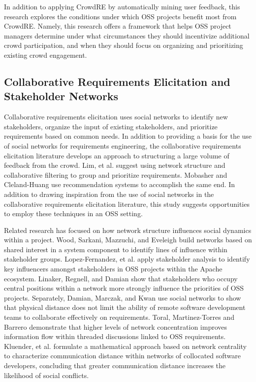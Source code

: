 In addition to applying CrowdRE by automatically mining user feedback, this research explores the conditions under which OSS projects benefit most from CrowdRE. Namely, this research offers a framework that helps OSS project managers determine under what circumstances they should incentivize additional crowd participation, and when they should focus on organizing and prioritizing existing crowd engagement. 

\subsection{Collaborative Requirements Elicitation and Stakeholder Networks}
\label{network_re}

Collaborative requirements elicitation \cite{stakerare, stakenet, stakesource, mobasher} uses social networks to identify new stakeholders, organize the input of existing stakeholders, and prioritize requirements based on common needs. In addition to providing a basis for the use of social networks for requirements engineering, the collaborative requirements elicitation literature develops an approach to structuring a large volume of feedback from the crowd. Lim, et al. \cite{stakerare, stakenet, stakesource, lim} suggest using network structure and collaborative filtering to group and prioritize requirements. Mobasher and Cleland-Huang \cite{mobasher} use recommendation systems to accomplish the same end. In addition to drawing inspiration from the use of social networks in the collaborative requirements elicitation literature, this study suggests opportunities to employ these techniques in an OSS setting.

Related research has focused on how network structure influences social dynamics within a project. Wood, Sarkani, Mazzuchi, and Eveleigh \cite{wood} build networks based on shared interest in a system component to identify lines of influence within stakeholder groups. Lopez-Fernandez, et al. \cite{lopez} apply stakeholder analysis to identify key influencers amongst stakeholders in OSS projects within the Apache ecosystem. Linaker, Regnell, and Damian \cite{linaker} show that stakeholders who occupy central positions within a network more strongly influence the priorities of OSS projects. Separately, Damian, Marczak, and Kwan \cite{damian} use social networks to show that physical distance does not limit the ability of remote software development teams to collaborate effectively on requirements. Toral, Martinez-Torres and Barrero \cite{toral} demonstrate that higher levels of network concentration improves information flow within threaded discussions linked to OSS requirements. Kluender, et al. \cite{kluender} formulate a mathematical approach based on network centrality to characterize communication distance within networks of collocated software developers, concluding that greater communication distance increases the likelihood of social conflicts.

